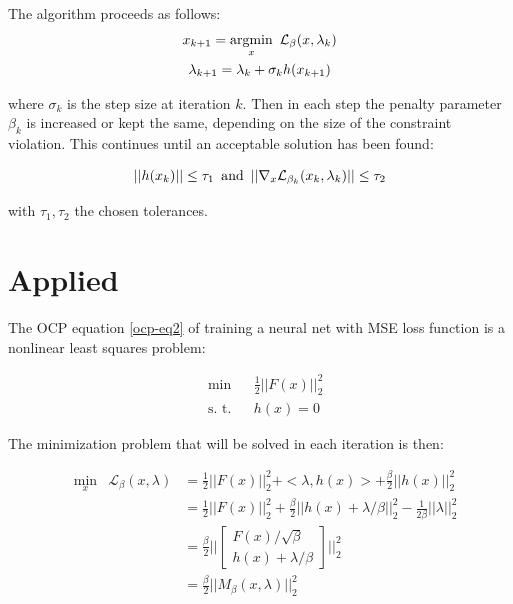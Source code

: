 The algorithm proceeds as follows:
\begin{gather*}
	x_{k+1} = \underset{x}{\text{argmin}} \hspace{.5em} \mathcal{L}_\beta(x,\lambda_k) \\
	\lambda_{k+1} = \lambda_k + \sigma_k h(x_{k+1})
\end{gather*}

where $\sigma_k$ is the step size at iteration $k$. Then in each step the penalty parameter $\beta_k$ is increased or kept the same, depending on the size of the constraint violation. This continues until an acceptable solution has been found:

\begin{equation}
	||h(x_k)|| \leq \tau_1 \hspace{.5em}\text{and}\hspace{.5em} ||\nabla_x\mathcal{L}_{\beta_k}(x_k,\lambda_k)|| \leq \tau_2
\end{equation}

with $\tau_1,\tau_2$ the chosen tolerances.

\section{Applied}

The OCP equation \ref{ocp-eq2} of training a neural net with MSE loss function is a nonlinear least squares problem:

\begin{equation*}
	\begin{aligned}
	& \text{min}
	&  & \frac{1}{2} ||F(x)||^2_2 \\
	& \text{s. t.}
	& &  h(x) = 0
	\end{aligned}
\end{equation*}

The minimization problem that will be solved in each iteration is then:

\begin{equation}
	\begin{aligned}
	 & \underset{x}{\text{min}} & \mathcal{L}_{\beta}(x,\lambda) 
	     &= \frac{1}{2} ||F(x)||^2_2 + <\lambda,h(x)> + \frac{\beta}{2} || h(x) ||^2_2 \\
	 & & &= \frac{1}{2} ||F(x)||^2_2 + \frac{\beta}{2} ||h(x) + \lambda/\beta ||^2_2 - \frac{1}{2\beta} ||\lambda||^2_2 \\
	 & & &= \frac{\beta}{2} \Big|\Big|
		\begin{bmatrix}
			F(x)/\sqrt{\beta} \\
			h(x) + \lambda/\beta
		\end{bmatrix} \Big|\Big|^2_2 \\
	 & & &= \frac{\beta}{2} ||M_{\beta}(x,\lambda)||^2_2
	\end{aligned}
	\label{loss}
\end{equation}

